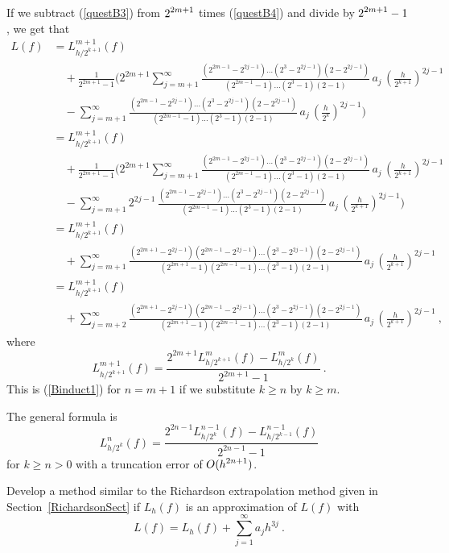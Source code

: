 {If we subtract (\ref{questB3}) from $\displaystyle 2^{2m+1}$
times (\ref{questB4}) and divide by $\displaystyle 2^{2m+1}-1$, we get that
\begin{align*}
L(f) &= L_{h/2^{k+1}}^{m+1}(f) \\
&\quad + \frac{1}{2^{2m+1}-1}
\bigg( 2^{2m+1} \sum_{j=m+1}^\infty
\frac{(2^{2m-1}-2^{2j-1}) \ldots (2^3-2^{2j-1})(2-2^{2j-1})}
{(2^{2m-1}-1)\ldots(2^3-1)(2-1)}\, a_j\, \left(\frac{h}{2^{k+1}}\right)^{2j-1} \\
&\quad -\sum_{j=m+1}^\infty
\frac{(2^{2m-1}-2^{2j-1}) \ldots (2^3-2^{2j-1})(2-2^{2j-1})}
{(2^{2m-1}-1)\ldots(2^3-1)(2-1)}\, a_j\, \left(\frac{h}{2^k}\right)^{2j-1}
\bigg) \\
&= L_{h/2^{k+1}}^{m+1}(f) \\
&\quad + \frac{1}{2^{2m+1}-1}
\bigg( 2^{2m+1} \sum_{j=m+1}^\infty
\frac{(2^{2m-1}-2^{2j-1}) \ldots (2^3-2^{2j-1})(2-2^{2j-1})}
{(2^{2m-1}-1)\ldots(2^3-1)(2-1)}\, a_j\, \left(\frac{h}{2^{k+1}}\right)^{2j-1} \\
&\quad -\sum_{j=m+1}^\infty
2^{2j-1} \,\frac{(2^{2m-1}-2^{2j-1}) \ldots (2^3-2^{2j-1})(2-2^{2j-1})}
{(2^{2m-1}-1)\ldots(2^3-1)(2-1)}\, a_j\, \left(\frac{h}{2^{k+1}}\right)^{2j-1}
\bigg) \\
&= L_{h/2^{k+1}}^{m+1}(f) \\
&\quad + \sum_{j=m+1}^\infty
\frac{(2^{2m+1} - 2^{2j-1})(2^{2m-1}-2^{2j-1}) \ldots (2^3-2^{2j-1})(2-2^{2j-1})}
{(2^{2m+1}-1)(2^{2m-1}-1)\ldots(2^3-1)(2-1)}\,
a_j\, \left(\frac{h}{2^{k+1}}\right)^{2j-1} \\
&= L_{h/2^{k+1}}^{m+1}(f) \\
&\quad + \sum_{j=m+2}^\infty
\frac{(2^{2m+1} - 2^{2j-1})(2^{2m-1}-2^{2j-1}) \ldots (2^3-2^{2j-1})(2-2^{2j-1})}
{(2^{2m+1}-1)(2^{2m-1}-1)\ldots(2^3-1)(2-1)}\,
 a_j\, \left(\frac{h}{2^{k+1}}\right)^{2j-1}\ ,
\end{align*}
where
\[
L_{h/2^{k+1}}^{m+1}(f) = \frac{2^{2m+1}L_{h/2^{k+1}}^m(f)-L_{h/2^k}^m(f)}
{2^{2m+1}-1} \ .
\]
This is (\ref{Binduct1}) for $n=m+1$ if we substitute
$k \geq n$ by $k\geq m$.

The general formula is
\[
L_{h/2^k}^n(f) = \frac{2^{2n-1} L_{h/2^k}^{n-1}(f) -
  L_{h/2^{k-1}}^{n-1}(f)}{2^{2n-1} -1}
\]
for $k \geq n > 0$ with a truncation error of $\displaystyle O(h^{2n+1})$.
}

\begin{question}
Develop a method similar to the Richardson extrapolation method given
in Section~\ref{RichardsonSect} if $L_h(f)$ is an approximation of
$L(f)$ with
\begin{equation}\label{questC1}
L(f) = L_h(f) + \sum_{j=1}^\infty a_j h^{3j} \ .
\end{equation}
\end{question}

